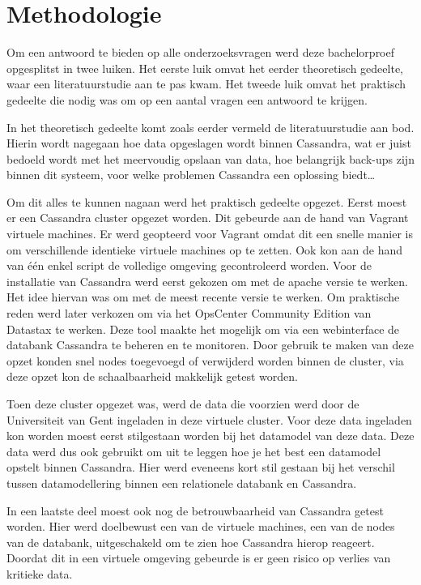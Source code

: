 \chapter{Methodologie}
\label{ch:methodologie}


Om een antwoord te bieden op alle onderzoeksvragen werd deze bachelorproef opgesplitst in twee luiken.
Het eerste luik omvat het eerder theoretisch gedeelte, waar een literatuurstudie aan te pas kwam.
Het tweede luik omvat het praktisch gedeelte die nodig was om op een aantal vragen een antwoord te krijgen.

In het theoretisch gedeelte komt zoals eerder vermeld de literatuurstudie aan bod.
Hierin wordt nagegaan hoe data opgeslagen wordt binnen Cassandra, wat er juist bedoeld wordt met het meervoudig opslaan van data, hoe belangrijk back-ups zijn binnen dit systeem, voor welke problemen Cassandra een oplossing biedt\dots

Om dit alles te kunnen nagaan werd het praktisch gedeelte opgezet.
Eerst moest er een Cassandra cluster opgezet worden.
Dit gebeurde aan de hand van Vagrant virtuele machines.
Er werd geopteerd voor Vagrant omdat dit een snelle manier is om verschillende identieke virtuele machines op te zetten.
Ook kon aan de hand van één enkel script de volledige omgeving gecontroleerd worden.
Voor de installatie van Cassandra werd eerst gekozen om met de apache versie te werken.
Het idee hiervan was om met de meest recente versie te werken.
Om praktische reden werd later verkozen om via het OpsCenter Community Edition van Datastax te werken.
Deze tool maakte het mogelijk om via een webinterface de databank Cassandra te beheren en te monitoren.
Door gebruik te maken van deze opzet konden snel nodes toegevoegd of verwijderd worden binnen de cluster, via deze opzet kon de schaalbaarheid makkelijk getest worden.

Toen deze cluster opgezet was, werd de data die voorzien werd door de Universiteit van Gent ingeladen in deze virtuele cluster.
Voor deze data ingeladen kon worden moest eerst stilgestaan worden bij het datamodel van deze data.
Deze data werd dus ook gebruikt om uit te leggen hoe je het best een datamodel opstelt binnen Cassandra.
Hier werd eveneens kort stil gestaan bij het verschil tussen datamodellering binnen een relationele databank en Cassandra. 

In een laatste deel moest ook nog de betrouwbaarheid van Cassandra getest worden.
Hier werd doelbewust een van de virtuele machines, een van de nodes van de databank, uitgeschakeld om te zien hoe Cassandra hierop reageert.
Doordat dit in een virtuele omgeving gebeurde is er geen risico op verlies van kritieke data.